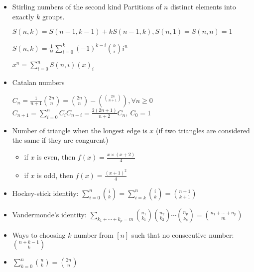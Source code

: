 \begin{itemize}
\item Stirling numbers of the second kind
Partitions of $n$ distinct elements into exactly $k$ groups. 

$S(n, k) = S(n - 1, k - 1) + kS(n - 1, k), S(n, 1) = S(n, n) = 1$

$S(n, k) = \frac{1}{k!}\sum_{i=0}^{k}(-1)^{k-i}{k \choose i}i^n$

$x^n     = \sum_{i=0}^{n} S(n, i) (x)_i$

\item Catalan numbers

$C_n = \frac{1}{n+1}{2n \choose n} = {2n \choose n}-\binom{2n \choose n+1}\ , \forall n \geq 0 $
$C_{n+1} = \sum_{i=0}^{n} C_iC_{n-i} = \frac{2(2n+1)}{n+2}C_n,\ C_0 = 1$


\item Number of triangle when the longest edge is $x$ (if two triangles are considered the same if they are congurent)
\begin{itemize}
    \itemsep-0.5em
	\item if $x$ is even, then $f(x) = \frac{x \times (x + 2)}{4}$
	\item if $x$ is odd, then $f(x) = \frac{(x + 1)^2}{4}$
\end{itemize}

\item Hockey-stick identity: $\displaystyle\sum_{i = 0}^n {i\choose k} = \displaystyle\sum_{i = k}^n {i \choose k} = {{n + 1}\choose{k + 1}}$

\item Vandermonde's identity: $\displaystyle\sum_{k_1 + \cdots + k_p = m} {{n_1}\choose{k_1}}{{n_2}\choose{k_2}} \cdots {{n_p}\choose{k_p}} = {{n_1 + \cdots + n_p}\choose m}$

\item Ways to choosing $k$ number from $[n]$ such that no consecutive number: ${{n + k - 1}\choose k}$

\item $\displaystyle\sum_{k = 0}^n {n\choose k} = {{2n}\choose n}$

\end{itemize}

